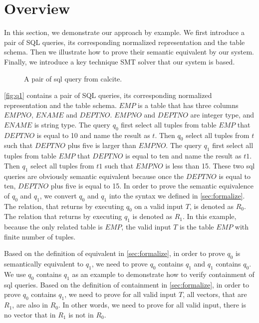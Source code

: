 

\section{Overview}\label{sec:overview}
%
In this section, we demonstrate our approach by example.
%
We first introduce a pair of SQL queries, its corresponding normalized representation and the table schema.
%
Then we illustrate how to prove their semantic equivalent by our system.
%
Finally, we introduce a key technique SMT solver that our system is based.

%
\begin{figure}

\caption{%
    A pair of sql query from calcite.
  }\label{fig:q1}
\end{figure}
%

\autoref{fig:q1} contains a pair of SQL queries, its corresponding normalized representation and the table schema.
%
$EMP$ is a table that has three columns $EMPNO$, $ENAME$ and $DEPTNO$.
%
$EMPNO$ and $DEPTNO$ are integer type, and $ENAME$ is string type.
%
The query $q_0$ first select all tuples from table $EMP$ that $DEPTNO$ is equal to
10 and name the result as $t$.
%
Then $q_0$ select all tuples from $t$ such that $DEPTNO$ plus five is larger than $EMPNO$.
%
The query $q_1$ first select all tuples from table $EMP$ that $DEPTNO$ is equal to
ten and name the result as $t1$.
%
Then $q_1$ select all tuples from $t1$ such that $EMPNO$ is less than 15.
%
These two sql queries are obviously semantic equivalent 
because once the $DEPTNO$ is equal to ten, $DEPTNO$ plus five is equal to 15.
%
In order to prove the semantic equivalence of $q_0$ and $q_1$, we convert $q_0$ and 
$q_1$ into the syntax we defined in \autoref{sec:formalize}.
%
The relation, that returns by executing $q_0$ on a valid input $T$, is denoted as $R_0$.
%
The relation that returns by executing $q_1$ is denoted as $R_1$.
%
In this example, because the only related table is $EMP$, the valid input $T$ is the table $EMP$ with
finite number of tuples.

%
Based on the definition of equivalent in \autoref{sec:formalize}, in order to prove $q_0$ is semantically
equivalent to $q_1$, we need to prove $q_0$ contains $q_1$ and $q_1$ contains $q_0$.
%
We use $q_0$ contains $q_1$ as an example to demonstrate how to verify containment of sql queries.
%
Based on the definition of containment in \autoref{sec:formalize}, in order to prove $q_0$ contains 
$q_1$, we need to prove for all valid input $T$, all vectors, that are $R_1$, are also in $R_0$. 
%
In other words, we need to prove for all valid input, there is no vector that in $R_1$ is not in $R_0$.
%

